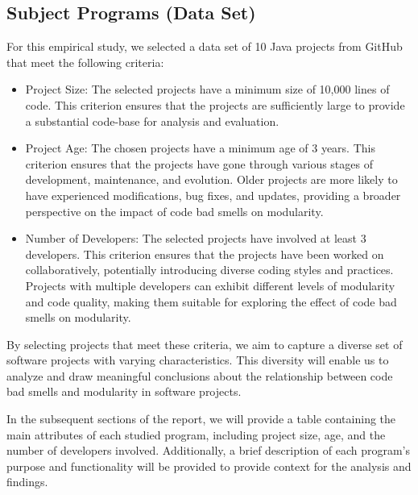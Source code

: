 \documentclass[conference]{IEEEtran}
\begin{document}
	\subsection{Subject Programs (Data Set)}
	For this empirical study, we selected a data set of 10 Java projects from GitHub that meet the following criteria:
	\begin{itemize}
		\item Project Size: The selected projects have a minimum size of 10,000 lines of code. This criterion ensures that the projects are sufficiently large to provide a substantial code-base for analysis and evaluation.
		
		\item Project Age: The chosen projects have a minimum age of 3 years. This criterion ensures that the projects have gone through various stages of development, maintenance, and evolution. Older projects are more likely to have experienced modifications, bug fixes, and updates, providing a broader perspective on the impact of code bad smells on modularity.
		
		\item Number of Developers: The selected projects have involved at least 3 developers. This criterion ensures that the projects have been worked on collaboratively, potentially introducing diverse coding styles and practices. Projects with multiple developers can exhibit different levels of modularity and code quality, making them suitable for exploring the effect of code bad smells on modularity.
	\end{itemize}

	By selecting projects that meet these criteria, we aim to capture a diverse set of software projects with varying characteristics. This diversity will enable us to analyze and draw meaningful conclusions about the relationship between code bad smells and modularity in software projects.
	
	In the subsequent sections of the report, we will provide a table containing the main attributes of each studied program, including project size, age, and the number of developers involved. Additionally, a brief description of each program's purpose and functionality will be provided to provide context for the analysis and findings.
	
\end{document}
